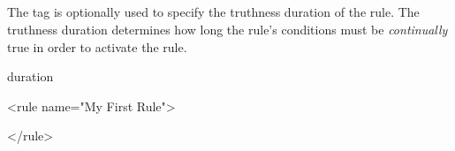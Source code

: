 
\subsection{}

The  tag is optionally used to specify the truthness
duration of the rule.  The truthness duration determines how long
the rule's conditions must be \emph{continually} true in order
to activate the rule.

\begin{tagDesc}{duration}
\attrs
\end{tagDesc}

\begin{center}
\begin{minipage}{0.8\textwidth}
\begin{tagExample}
<rule name="My First Rule">

    \color{black}{<duration hours="2"}
              \color{black}{minutes="30"/>}

</rule>
\end{tagExample}
\end{minipage}
\end{center}
